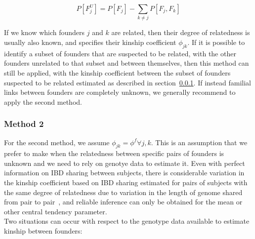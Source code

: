 \documentclass[12pt]{aastex}
\begin{document}
\begin{equation}
P[F_j^U] = P[F_j] - \sum_{k \neq j} P[F_j,F_k]
\label{FU}
\end{equation}

If we know which founders $j$ and $k$ are related, then their degree of relatedness is usually also known, and specifies their kinship coefficient $\phi_{jk}$. If it is possible to identify a subset of founders that are suspected to be related, with the other founders unrelated to that subset and between themselves, then this method can still be applied, with the kinship coefficient between the subset of founders suspected to be related estimated as described in section~\ref{method2}. If instead familial links between founders are completely unknown, we generally recommend to apply the second method. 

\subsubsection{Method 2}
\label{method2}

For the second method, we assume $\phi_{jk} = \phi^f \forall j,k$. This is an assumption that we prefer to make when the relatedness between specific pairs of founders is unknown and we need to rely on genotye data to estimate it. Even with perfect information on IBD sharing between subjects, there is considerable variation in the kinship coefficient based on IBD sharing estimated for pairs of subjects with the same degree of relatedness due to variation in the length of genome shared from pair to pair~\citep{Manichaikul10}, and reliable inference can only be obtained for the mean or other central tendency parameter.\\

Two situations can occur with respect to the genotype data available to estimate kinship between founders:
\end{document}
